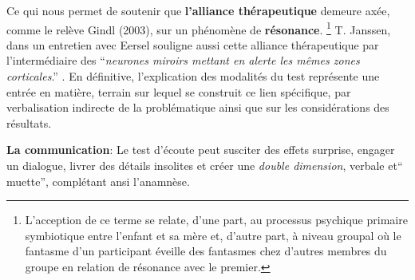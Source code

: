  
Ce qui nous permet de soutenir que 
 \textbf{l'alliance thérapeutique} demeure axée, comme le relève Gindl (2003), sur 
 un phénomène de \textbf{résonance}. \footnote{L'acception de ce terme se relate, d'une part, au processus psychique
primaire symbiotique entre l'enfant et sa mère et, d'autre part, à
niveau groupal où le fantasme d'un participant éveille des fantasmes chez d'autres membres du groupe en relation
de résonance  avec le premier\autocite {doronparot}.}
T. Janssen, dans un entretien
avec Eersel
souligne aussi cette alliance thérapeutique
par l'intermédiaire des ``\textit{neurones
 miroirs mettant en alerte les mêmes zones corticales}.'' \autocite[203]{van_eersel_cerveau}.
En définitive, l'explication des modalités du test représente une
  entrée en matière, terrain  sur lequel se construit ce lien spécifique, 
  par verbalisation indirecte de la problématique ainsi que sur 
  les considérations des résultats.
  
  
   

  
\textbf{La communication}:
  Le test d'écoute 
  peut susciter des effets surprise, engager un dialogue, livrer des détails
 insolites et créer une \textit{double dimension}, verbale et``
 muette'', complétant ansi l'anamnèse.
 


